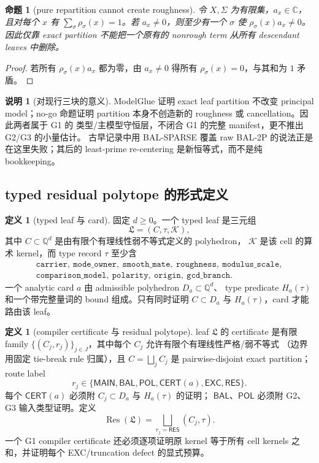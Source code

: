 \documentclass[11pt,a4paper]{ctexart}
\newtheorem{proposition}[theorem]{命题}
\theoremstyle{definition}
\newtheorem{definition}[theorem]{定义}
\newtheorem{remark}[theorem]{说明}
\newcommand{\1}{\mathbf 1}
\begin{document}
\begin{proposition}[pure repartition cannot create roughness]
令 $X,\Sigma$ 为有限集，$a_x\in\mathbb C$，且对每个 $x$ 有
$\sum_\sigma\rho_\sigma(x)=1$。若 $a_x\ne0$，则至少有一个 $\sigma$ 使
$\rho_\sigma(x)a_x\ne0$。因此仅靠 exact partition 不能把一个原有的
nonrough term 从所有 descendant leaves 中删除。
\end{proposition}

\begin{proof}
若所有 $\rho_\sigma(x)a_x$ 都为零，由 $a_x\ne0$ 得所有
$\rho_\sigma(x)=0$，与其和为 $1$ 矛盾。
\end{proof}

\begin{remark}[对现行三块的意义]
ModelGlue 证明 exact leaf partition 不改变 principal model；no-go 命题证明
partition 本身不创造新的 roughness 或 cancellation。因此两者属于 G1 的
类型/主模型守恒层，不闭合 G1 的完整 manifest，更不推出 G2/G3 的小量估计。
古早记录中用 BAL-SPARSE 覆盖 raw BAL-2P 的说法正是在这里失败；其后的
least-prime re-centering 是新恒等式，而不是纯 bookkeeping。
\end{remark}

\subsection{typed residual polytope 的形式定义}

\begin{definition}[typed leaf 与 card]
固定 $d\ge0$。一个 typed leaf 是三元组
\[
\mathfrak L=(C,\tau,\mathcal K),                       \tag{RP.1}
\]
其中 $C\subset\mathbb Q^d$ 是由有限个有理线性弱不等式定义的 polyhedron，
$\mathcal K$ 是该 cell 的算术 kernel，而 type record $\tau$ 至少含
\[
\begin{gathered}
\texttt{carrier},\ \texttt{mode\_owner},\ \texttt{smooth\_mate},\
\texttt{roughness},\ \texttt{modulus\_scale},\\
\texttt{comparison\_model},\ \texttt{polarity},\
\texttt{origin},\ \texttt{gcd\_branch}.              \tag{RP.2}
\end{gathered}
\]
一个 analytic card $a$ 由 admissible polyhedron $D_a\subset\mathbb Q^d$、
type predicate $H_a(\tau)$ 和一个带完整量词的 bound 组成。只有同时证明
$C\subset D_a$ 与 $H_a(\tau)$，card 才能路由该 leaf。
\end{definition}

\begin{definition}[compiler certificate 与 residual polytope]
leaf $\mathfrak L$ 的 certificate 是有限 family
$\{(C_j,r_j)\}_{j\in J}$，其中每个 $C_j$ 允许有限个有理线性严格/弱不等式
（边界用固定 tie-break rule 归属），且
$C=\bigsqcup_jC_j$ 是 pairwise-disjoint exact partition；route label
\[
r_j\in\{\mathsf{MAIN},\mathsf{BAL},\mathsf{POL},
\mathsf{CERT}(a),\mathsf{EXC},\mathsf{RES}\}.          \tag{RP.3}
\]
每个 $\mathsf{CERT}(a)$ 必须附 $C_j\subset D_a$ 与 $H_a(\tau)$ 的证明；
$\mathsf{BAL}$、$\mathsf{POL}$ 必须附 G2、G3 输入类型证明。定义
\[
\operatorname{Res}(\mathfrak L)
=\bigsqcup_{r_j=\mathsf{RES}}(C_j,\tau).               \tag{RP.4}
\]
一个 G1 compiler certificate 还必须逐项证明原 kernel 等于所有 cell kernels
之和，并证明每个 \textsf{EXC}/truncation defect 的显式预算。
\end{definition}
\end{document}
